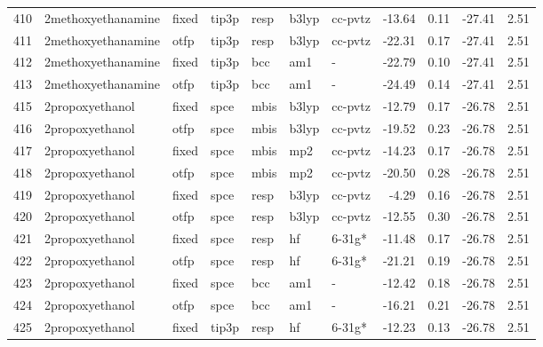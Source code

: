 \begin{tabular}{lllllllrrrr}
410 &            2methoxyethanamine &  fixed &  tip3p &   resp &   b3lyp &      cc-pvtz &      -13.64 &     0.11 &      -27.41 &      2.51 \\
411 &            2methoxyethanamine &   otfp &  tip3p &   resp &   b3lyp &      cc-pvtz &      -22.31 &     0.17 &      -27.41 &      2.51 \\
412 &            2methoxyethanamine &  fixed &  tip3p &    bcc &     am1 &            - &      -22.79 &     0.10 &      -27.41 &      2.51 \\
413 &            2methoxyethanamine &   otfp &  tip3p &    bcc &     am1 &            - &      -24.49 &     0.14 &      -27.41 &      2.51 \\
415 &               2propoxyethanol &  fixed &   spce &   mbis &   b3lyp &      cc-pvtz &      -12.79 &     0.17 &      -26.78 &      2.51 \\
416 &               2propoxyethanol &   otfp &   spce &   mbis &   b3lyp &      cc-pvtz &      -19.52 &     0.23 &      -26.78 &      2.51 \\
417 &               2propoxyethanol &  fixed &   spce &   mbis &     mp2 &      cc-pvtz &      -14.23 &     0.17 &      -26.78 &      2.51 \\
418 &               2propoxyethanol &   otfp &   spce &   mbis &     mp2 &      cc-pvtz &      -20.50 &     0.28 &      -26.78 &      2.51 \\
419 &               2propoxyethanol &  fixed &   spce &   resp &   b3lyp &      cc-pvtz &       -4.29 &     0.16 &      -26.78 &      2.51 \\
420 &               2propoxyethanol &   otfp &   spce &   resp &   b3lyp &      cc-pvtz &      -12.55 &     0.30 &      -26.78 &      2.51 \\
421 &               2propoxyethanol &  fixed &   spce &   resp &      hf &       6-31g* &      -11.48 &     0.17 &      -26.78 &      2.51 \\
422 &               2propoxyethanol &   otfp &   spce &   resp &      hf &       6-31g* &      -21.21 &     0.19 &      -26.78 &      2.51 \\
423 &               2propoxyethanol &  fixed &   spce &    bcc &     am1 &            - &      -12.42 &     0.18 &      -26.78 &      2.51 \\
424 &               2propoxyethanol &   otfp &   spce &    bcc &     am1 &            - &      -16.21 &     0.21 &      -26.78 &      2.51 \\
425 &               2propoxyethanol &  fixed &  tip3p &   resp &      hf &       6-31g* &      -12.23 &     0.13 &      -26.78 &      2.51 \\

\end{tabular}
